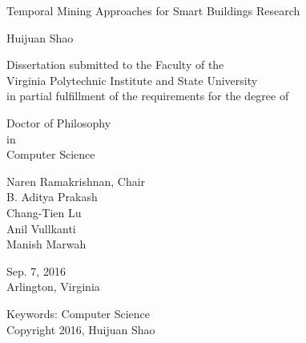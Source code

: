 \documentclass[12pt,pdf]{report}
\begin{document}
\thispagestyle{empty}
\begin{center}

{\Large 
Temporal Mining Approaches for Smart Buildings Research
}

\vfill

Huijuan Shao

\vfill

Dissertation submitted to the Faculty of the \\
Virginia Polytechnic Institute and State University \\
in partial fulfillment of the requirements for the degree of

\vfill

Doctor of Philosophy \\
in \\
Computer Science

\vfill

Naren Ramakrishnan, Chair \\
B. Aditya Prakash \\
Chang-Tien Lu \\
Anil Vullkanti \\
Manish Marwah

\vfill

Sep. 7, 2016 \\
Arlington, Virginia

\vfill

Keywords: Computer Science
\\
Copyright 2016, Huijuan Shao

\end{center}

\pagebreak
\end{document}
